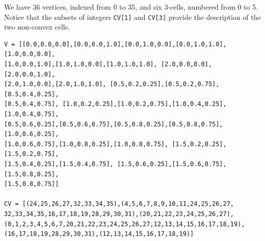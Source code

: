 \documentclass[11pt,oneside]{article}    %
\begin{document}
We have 36 vertices, indexed from 0 to 35, and six 3-cells, numbered from 0 to 5.
Notice that the subsets of integers  \texttt{CV[1]} and \texttt{CV[3]} provide the 
description of the two non-convex cells.

\begin{verbatim}
V = [[0.0,0.0,0.0],[0.0,0.0,1.0],[0.0,1.0,0.0],[0.0,1.0,1.0], [1.0,0.0,0.0],
[1.0,0.0,1.0],[1.0,1.0,0.0],[1.0,1.0,1.0], [2.0,0.0,0.0],[2.0,0.0,1.0],
[2.0,1.0,0.0],[2.0,1.0,1.0], [0.5,0.2,0.25],[0.5,0.2,0.75],[0.5,0.4,0.25],
[0.5,0.4,0.75], [1.0,0.2,0.25],[1.0,0.2,0.75],[1.0,0.4,0.25],[1.0,0.4,0.75], 
[0.5,0.6,0.25],[0.5,0.6,0.75],[0.5,0.8,0.25],[0.5,0.8,0.75], [1.0,0.6,0.25],
[1.0,0.6,0.75],[1.0,0.8,0.25],[1.0,0.8,0.75], [1.5,0.2,0.25],[1.5,0.2,0.75],
[1.5,0.4,0.25],[1.5,0.4,0.75], [1.5,0.6,0.25],[1.5,0.6,0.75],[1.5,0.8,0.25],
[1.5,0.8,0.75]]

CV = [(24,25,26,27,32,33,34,35),(4,5,6,7,8,9,10,11,24,25,26,27,
32,33,34,35,16,17,18,19,28,29,30,31),(20,21,22,23,24,25,26,27),
(0,1,2,3,4,5,6,7,20,21,22,23,24,25,26,27,12,13,14,15,16,17,18,19),
(16,17,18,19,28,29,30,31),(12,13,14,15,16,17,18,19)]
\end{verbatim}
\end{document}
